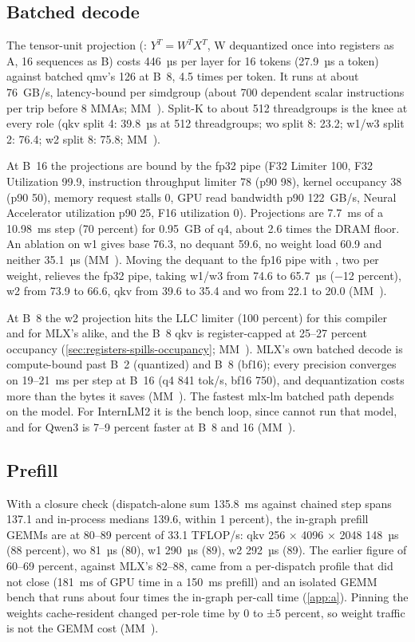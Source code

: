 \subsection*{Batched decode}

The tensor-unit projection (: $Y^{T} = W^{T} X^{T}$, W dequantized once into registers as A, 16 sequences
as B) costs 446~µs per layer for 16 tokens (27.9~µs a token) against batched qmv's 126 at B~8, 4.5 times per token.
It runs at about 76~GB/s, latency-bound per simdgroup (about 700 dependent scalar instructions per trip before 8 MMAs;
MM~). Split-K to about 512 threadgroups is the knee at every role (qkv split 4: 39.8~µs at 512
threadgroups; wo split 8: 23.2; w1/w3 split 2: 76.4; w2 split 8: 75.8; MM~).

At B~16 the projections are bound by the fp32 pipe (F32 Limiter 100, F32 Utilization 99.9, instruction throughput
limiter 78 (p90 98), kernel occupancy 38 (p90 50), memory request stalls 0, GPU read bandwidth p90 122~GB/s, Neural
Accelerator utilization p90 25, F16 utilization 0). Projections are 7.7~ms of a 10.98~ms step (70 percent) for
0.95~GB of q4, about 2.6 times the DRAM floor. An ablation on w1 gives base 76.3, no dequant 59.6, no weight load 60.9
and neither 35.1~µs (MM~). Moving the dequant to the fp16 pipe with , two per weight, relieves the
fp32 pipe, taking w1/w3 from 74.6 to 65.7~µs (−12 percent), w2 from 73.9 to 66.6, qkv from 39.6 to 35.4 and wo from
22.1 to 20.0 (MM~).

At B~8 the w2 projection hits the LLC limiter (100 percent) for this compiler and for MLX's 
alike, and the B~8 qkv is register-capped at 25–27 percent occupancy (\cref{sec:registers-spills-occupancy};
MM~). MLX's own batched decode is compute-bound past B~2 (quantized) and B~8 (bf16); every precision
converges on 19–21~ms per step at B~16 (q4 841 tok/s, bf16 750), and dequantization costs more than the bytes it
saves (MM~). The fastest mlx-lm batched path depends on the model. For InternLM2 it is the bench loop,
since  cannot run that model, and for Qwen3  is 7–9 percent faster at B~8
and 16 (MM~).

\subsection*{Prefill}

With a closure check (dispatch-alone sum 135.8~ms against chained step spans 137.1 and in-process medians 139.6,
within 1 percent), the in-graph prefill GEMMs are at 80–89 percent of 33.1 TFLOP/s: qkv 256 × 4096 × 2048 148~µs (88
percent), wo 81~µs (80), w1 290~µs (89), w2 292~µs (89). The earlier figure of 60–69 percent, against MLX's 82–88,
came from a per-dispatch profile that did not close (181~ms of GPU time in a 150~ms prefill) and an isolated GEMM
bench that runs about four times the in-graph per-call time (\cref{app:a}). Pinning the weights cache-resident changed
per-role time by 0 to ±5 percent, so weight traffic is not the GEMM cost (MM~).

